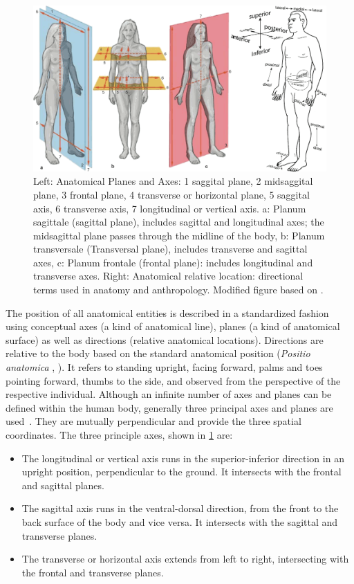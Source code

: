 \documentclass[sw]{iosart2x}
\newcommand{\latin}[1]{\emph{#1}}
\begin{document}
\begin{figure}
\includegraphics[width=\textwidth]{img/axisplanelocation.png}
\caption{Left: Anatomical Planes and Axes:
1 saggital plane,
2 midsaggital plane,
3 frontal plane,
4 transverse or horizontal plane,
5 saggital axis,
6 transverse axis,
7 longitudinal or vertical axis.
a: Planum sagittale (sagittal plane), includes sagittal and longitudinal axes; the midsagittal plane passes through the midline of the body,
b: Planum transversale (Transversal plane), includes transverse and sagittal axes,
c: Planum frontale (frontal plane): includes longitudinal and transverse axes.
Right: Anatomical relative location: directional terms used in anatomy and anthropology.
Modified figure based on \cite{allgemeineanatomieen,schemamann}.}
\label{fig:axisplane}
\end{figure}
The position of all anatomical entities is described in a standardized fashion using conceptual axes (a kind of anatomical line), planes (a kind of anatomical surface) as well as directions (relative anatomical locations).
Directions are relative to the body based on the standard anatomical position (\latin{Positio anatomica} , ).
It refers to standing upright, facing forward, palms and toes pointing forward, thumbs to the side, and observed from the perspective of the respective individual. %
%
Although an infinite number of axes and planes can be defined within the human body, generally three principal axes and planes are used~\citep{prometheus}.
They are mutually perpendicular and provide the three spatial coordinates.
The three principle axes, shown in \cref{fig:axisplane} are:
\begin{itemize}
\item The longitudinal or vertical axis runs in the superior-inferior direction in an upright position, perpendicular to the ground.
It intersects with the frontal and sagittal planes.
\item The sagittal axis runs in the ventral-dorsal direction, from the front to the back surface of the body and vice versa.
It intersects with the sagittal and transverse planes.
\item The transverse or horizontal axis extends from left to right, intersecting with the frontal and transverse planes.
\end{itemize}
\end{document}
